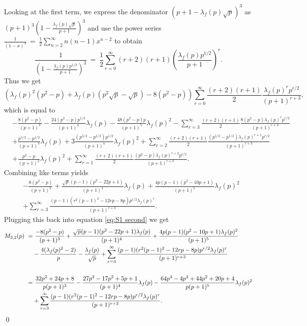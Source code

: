 \documentclass[11pt, reqno]{amsart}
\theoremstyle{definition}
\theoremstyle{remark}
\numberwithin{equation}{section}
\begin{document}
Looking at the first term, we express the denominator $(p+1-\lambda_f(p)\sqrt{p})^{3}$ as $(p+1)^{3}\left(1-\frac{\lambda_f(p)\sqrt{p}}{p+1} \right)^{3}$ and use the power series $\frac{1}{(1-x)^3}\ = \ \frac{1}{2}\sum_{n=2}^{\infty}n(n-1)x^{n-2}$ to obtain
$$\frac{1}{\left(1-\frac{\lambda_f(p)p^{1/2}}{p+1}\right)^3}\ =\ \frac{1}{2}\sum_{r=0}^{\infty}(r+2)(r+1)\left(\frac{\lambda_f(p)p^{1/2}}{p+1} \right)^{r}.$$
Thus we get $$\left(\lambda_f(p)^2(p^2-p)+\lambda_f(p)(p^2\sqrt{p}-\sqrt{p})-8(p^2-p)\right)\sum_{r=0}^{\infty}\frac{(r+2)(r+1)}{2}\frac{\lambda_f(p)^rp^{r/2}}{(p+1)^{r+3}},$$
which is equal to
\small
\begin{align*}
&-\frac{8(p^2-p)}{(p+1)^3}-\frac{24(p^2-p)p^{1/2}}{(p+1)^4}\lambda_f(p)-\frac{48(p^2-p)p}{(p+1)^5}\lambda_f(p)^2-\sum_{r=3}^{\infty}\frac{(r+2)(r+1)}{2}\frac{8(p^2-p)\lambda_f(p)^rp^{r/2}}{(p+1)^{r+3}}\\
&+\frac{p^{5/2}-p^{1/2}}{(p+1)^3}\lambda_f(p)+3\frac{(p^{5/2}-p^{1/2})p^{1/2}}{(p+1)^4}\lambda_f(p)^2+\sum_{r=2}^{\infty}\frac{(r+2)(r+1)}{2}\frac{(p^{5/2}-p^{1/2})\lambda_f(p)^{r+1}p^{r/2}}{(p+1)^{r+3}}\\
&+\frac{p^2-p}{(p+1)^3}\lambda_f(p)^2+\sum_{r=1}^{\infty}\frac{(r+2)(r+1)}{2}\frac{(p^2-p)\lambda_f(p)^{r+2}p^{r/2}}{(p+1)^{r+3}}.
\end{align*}\normalsize
Combining like terms yields
\begin{align*}
    &-\frac{8(p^2-p)}{(p+1)^3} + \frac{\sqrt{p}(p-1)(p^2-22p+1)}{(p+1)^4}\lambda_f(p)+\frac{4p(p-1)(p^2-10p+1)}{(p+1)^5}\lambda_f(p)^2 \\
    &+\sum_{r=3}^{\infty}\frac{(p-1)(r^2(p-1)^2-12rp-8p)p^{r/2}\lambda_f(p)^r}{(p+1)^{r+3}} .
\end{align*}
Plugging this back into equation \eqref{eq:S1 second} we get
\begin{align}\label{eq:S1 third}
\notag M_{3,2}(p)\ =&\ \frac{-8(p^2-p)}{(p+1)^3} + \frac{\sqrt{p}(p-1)(p^2-22p+1)\lambda_f(p)}{(p+1)^4}+\frac{4p(p-1)(p^2-10p+1)\lambda_f(p)^2}{(p+1)^5}\\&-\frac{4(\lambda_f(p)^2-2)}{p}-\frac{\lambda_f(p)}{\sqrt{p}}+ \sum_{r=3}^{\infty}\frac{(p-1)(r^2(p-1)^2-12rp-8p)p^{r/2}\lambda_f(p)^r}{(p+1)^{r+3}}   
\\\notag\\
=&\ \frac{32p^2+24p+8}{p(p+1)^3}-\frac{27p^3-17p^2+5p+1}{(p+1)^4}\lambda_f(p)
-\frac{64p^4-4p^3+44p^2+20p+4}{p(p+1)^5}\lambda_f(p)^2 \notag\\
&+\sum_{r=3}^{\infty}\frac{(p-1)(r^2(p-1)^2-12rp-8p)p^{r/2}\lambda_f(p)^r}{(p+1)^{r+3}}.
\end{align}\qed
\end{document}
